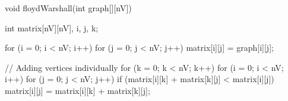 \newpage 
\begin{algorithm}
void floydWarshall(int graph[][nV]) {
  int matrix[nV][nV], i, j, k;

  for (i = 0; i < nV; i++)
    for (j = 0; j < nV; j++)
      matrix[i][j] = graph[i][j];

  // Adding vertices individually
  for (k = 0; k < nV; k++) {
    for (i = 0; i < nV; i++) {
      for (j = 0; j < nV; j++) {
        if (matrix[i][k] + matrix[k][j] < matrix[i][j])
          matrix[i][j] = matrix[i][k] + matrix[k][j];
      }
    }
  }
  
}
\end{algorithm}

